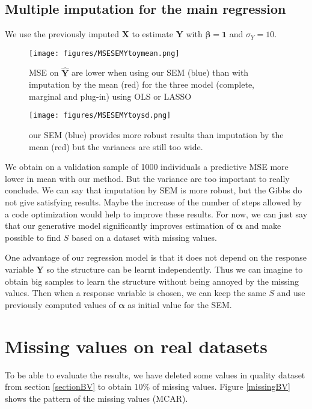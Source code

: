 \documentclass[12pt,a4paper]{report}
\begin{document}
		\subsection{Multiple imputation for the main regression}
		We use the previously imputed $\boldsymbol{X}$ to estimate $\boldsymbol{Y}$ with $\boldsymbol{\beta}=\boldsymbol{1}$ and $\sigma_Y=10$.
			\begin{figure}[h!]
	\centering
	\texttt{[image: figures/MSESEMYtoymean.png]} 
	\caption{MSE on $\hat{\boldsymbol{Y}}$ are lower when using our SEM (blue) than with imputation by the mean (red) for the three model (complete, marginal and plug-in) using OLS or LASSO}\label{MSESEMYtoymean}
\end{figure}	

			\begin{figure}[h!]
	\centering
	\texttt{[image: figures/MSESEMYtoysd.png]} 
	\caption{our SEM (blue) provides more robust results than imputation by the mean (red) but the variances are still too wide.}\label{MSESEMYtoysd}
\end{figure}		
We obtain on a validation sample of 1000 individuals a predictive MSE more lower in mean with our method. But the variance are too important to really conclude. We can say that imputation by SEM is more robust, but the Gibbs do not give satisfying results. Maybe the increase of the number of steps allowed by a code optimization would help to improve these results. For now, we can just say that our generative model significantly improves estimation of $\boldsymbol{\alpha}$ and make possible to find $S$ based on a dataset with missing values.

		One advantage of our regression model is that it does not depend on the response variable $\boldsymbol{Y}$ so the structure can be learnt independently. Thus we can imagine to obtain big samples to learn the structure without being annoyed by the missing values. Then when a response variable is chosen, we can keep the same $S$ and use previously computed values of $\boldsymbol{\alpha}$ as initial value for the SEM. 
	\section{Missing values on real datasets}	
		To be able to evaluate the results, we have deleted some values in quality dataset from section \ref{sectionBV} to obtain $10\%$ of missing values. Figure \ref{missingBV} shows the pattern of the missing values (MCAR). 
	
\end{document}
